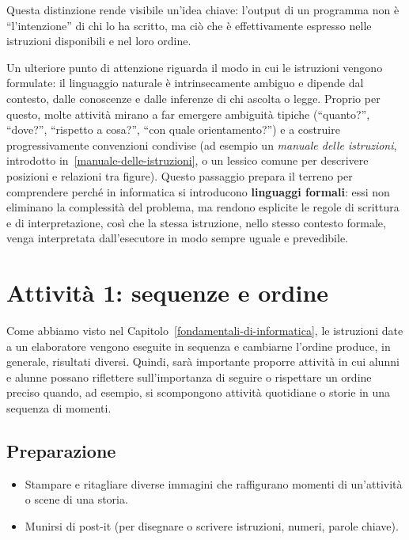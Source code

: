 Questa distinzione rende visibile un'idea chiave: l'output di un programma non è ``l'intenzione'' di chi lo ha scritto, ma ciò che è effettivamente espresso nelle istruzioni disponibili e nel loro ordine.

Un ulteriore punto di attenzione riguarda il modo in cui le istruzioni vengono formulate: il linguaggio naturale è intrinsecamente ambiguo e dipende dal contesto, dalle conoscenze e dalle inferenze di chi ascolta o legge. Proprio per questo, molte attività mirano a far emergere ambiguità tipiche (``quanto?'', ``dove?'', ``rispetto a cosa?'', ``con quale orientamento?'') e a costruire progressivamente convenzioni condivise (ad esempio un \emph{manuale delle istruzioni}, introdotto in~\ref{manuale-delle-istruzioni}, o un lessico comune per descrivere posizioni e relazioni tra figure). Questo passaggio prepara il terreno per comprendere perché in informatica si introducono \textbf{linguaggi formali}: essi non eliminano la complessità del problema, ma rendono esplicite le regole di scrittura e di interpretazione, così che la stessa istruzione, nello stesso contesto formale, venga interpretata dall'esecutore in modo sempre uguale e prevedibile.

\section{Attività 1: sequenze e ordine}

Come abbiamo visto nel Capitolo~\ref{fondamentali-di-informatica}, le istruzioni date a un elaboratore vengono eseguite in sequenza e cambiarne l'ordine produce, in generale, risultati diversi. Quindi, sarà importante proporre attività in cui alunni e alunne possano riflettere sull'importanza di seguire o rispettare un ordine preciso quando, ad esempio, si scompongono attività quotidiane o storie in una sequenza di momenti.

\subsection{Preparazione}

\begin{itemize}
\item
  Stampare e ritagliare diverse immagini che raffigurano momenti di un'attività o scene di una storia.
\item
  Munirsi di post-it (per disegnare o scrivere istruzioni, numeri, parole chiave).
\end{itemize}

